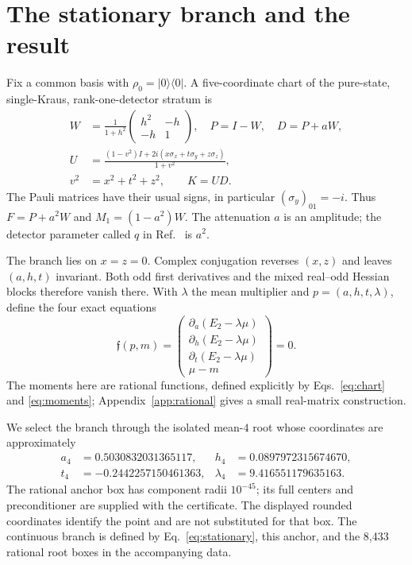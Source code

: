 \documentclass[aps,pra,reprint,amsmath,amssymb,longbibliography]{revtex4-2}
\newcommand{\ket}[1]{|#1\rangle}
\newcommand{\bra}[1]{\langle#1|}
\begin{document}
\section{The stationary branch and the result}\label{sec:branch}
Fix a common basis with $\rho_0=\ket0\bra0$. A five-coordinate chart of the pure-state, single-Kraus, rank-one-detector stratum is
\begin{align}
 W&=\frac{1}{1+h^2}\begin{pmatrix}h^2&-h\\-h&1\end{pmatrix},
 \quad P=I-W,\quad D=P+aW,\nonumber\\
 U&=\frac{(1-v^2)I+2i(x\sigma_x+t\sigma_y+z\sigma_z)}{1+v^2},\nonumber\\
 v^2&=x^2+t^2+z^2,\qquad K=UD.\label{eq:chart}
\end{align}
The Pauli matrices have their usual signs, in particular $(\sigma_y)_{01}=-i$. Thus $F=P+a^2W$ and $M_1=(1-a^2)W$. The attenuation $a$ is an amplitude; the detector parameter called $q$ in Ref.~\cite{Olamaei2026} is $a^2$.

The branch lies on $x=z=0$. Complex conjugation reverses $(x,z)$ and leaves $(a,h,t)$ invariant. Both odd first derivatives and the mixed real--odd Hessian blocks therefore vanish there. With $\lambda$ the mean multiplier and $p=(a,h,t,\lambda)$, define the four exact equations
\begin{equation}
 \mathfrak f(p,m)=
 \begin{pmatrix}
 \partial_a(E_2-\lambda\mu)\\
 \partial_h(E_2-\lambda\mu)\\
 \partial_t(E_2-\lambda\mu)\\
 \mu-m
 \end{pmatrix}=0.\label{eq:stationary}
\end{equation}
The moments here are rational functions, defined explicitly by Eqs.~\eqref{eq:chart} and \eqref{eq:moments}; Appendix~\ref{app:rational} gives a small real-matrix construction.

We select the branch through the isolated mean-$4$ root whose coordinates are approximately
\begin{align}
 a_4&=0.5030832031365117, & h_4&=0.0897972315674670,\nonumber\\
 t_4&=-0.2442257150461363, & \lambda_4&=9.416551179635163.
 \label{eq:anchor}
\end{align}
The rational anchor box has component radii $10^{-45}$; its full centers and preconditioner are supplied with the certificate. The displayed rounded coordinates identify the point and are not substituted for that box. The continuous branch is defined by Eq.~\eqref{eq:stationary}, this anchor, and the 8,433 rational root boxes in the accompanying data.
\end{document}
